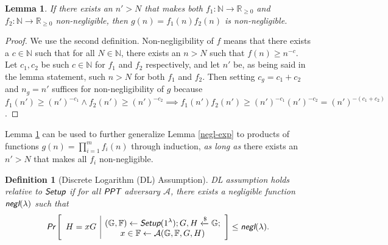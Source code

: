 \documentclass{article}
\newtheorem{definition}{Definition}[section]
\newtheorem{lemma}[theorem]{Lemma}
\begin{document}
\begin{lemma}\label{negl-prod}
If there exists an $n'>N$ that makes both $f_1:\mathbb{N}\rightarrow\mathbb{R}_{\ge 0}$ and $f_2:\mathbb{N}\rightarrow\mathbb{R}_{\ge 0}$ non-negligible, then $g(n)=f_1(n)f_2(n)$ is non-negligible.
\end{lemma}
\begin{proof}
We use the second definition. Non-negligibility of $f$ means that there exists a $c\in\mathbb{N}$ such that for all $N\in\mathbb{N}$, there exists an $n>N$ such that $f(n)\ge n^{-c}$. Let $c_1, c_2$ be such $c\in\mathbb{N}$ for $f_1$ and $f_2$ respectively, and let $n'$ be, as being said in the lemma statement, such $n>N$ for both $f_1$ and $f_2$. Then setting $c_g=c_1 + c_2$ and $n_g=n'$ suffices for non-negligibility of $g$ because $f_1(n')\ge (n')^{-c_1} \wedge f_2(n')\ge (n')^{-c_2} \implies f_1(n')f_2(n') \ge (n')^{-c_1}  (n')^{-c_2} = (n')^{-(c_1+c_2)}$.
\end{proof}

\noindent Lemma \ref{negl-prod} can be used to further generalize Lemma \ref{negl-exp} to products of functions $g(n)=\prod_{i=1}^m f_i(n)$ through induction, \textit{as long as} there exists an $n'>N$ that makes all $f_i$ non-negligible.

\begin{definition}[Discrete Logarithm (DL) Assumption]
DL assumption holds relative to $\emph{\textsf{Setup}}$ if for all $\emph{\textsf{PPT}}$ adversary $\mathcal{A}$, there exists a negligible function $\emph{\textsf{negl}}(\lambda)$ such that
\begin{align*}
\emph{\textsf{Pr}}\left[
\begin{array}{c|c}
    \begin{gathered}
        H = xG
    \end{gathered}
    &
    \begin{gathered}
        (\mathbb{G}, \mathbb{F})\leftarrow\emph{\textsf{Setup}}(1^{\lambda}); G,H\xleftarrow{\$}\mathbb{G}; \\
        x\in\mathbb{F}\leftarrow\mathcal{A}(\mathbb{G}, \mathbb{F}, G, H) \\
    \end{gathered}
\end{array}
\right]
\le \emph{\textsf{negl}}(\lambda).
\end{align*}
\end{definition}
\end{document}
